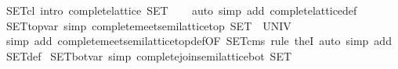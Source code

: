 \begin{isabellebody}
\endisatagproof
{\isafoldproof}%
%
\isadelimproof
\isanewline
%
\endisadelimproof
\isanewline
{}\isamarkupfalse%
\ SET{}cl\ {}intro{}{}\ {}complete{}lattice\ SET{}\isanewline
%
\isadelimproof
\ \ %
\endisadelimproof
%
\isatagproof
{}\isamarkupfalse%
\ {}auto\ simp\ add{}\ complete{}lattice{}def{}%
\endisatagproof
{\isafoldproof}%
%
\isadelimproof
\isanewline
%
\endisadelimproof
\isanewline
{}\isamarkupfalse%
\ SET{}top{}var\ {}simp{}{}\ {}complete{}meet{}semilattice{}top\ SET\ {}\ UNIV{}\isanewline
%
\isadelimproof
\ \ %
\endisadelimproof
%
\isatagproof
{}\isamarkupfalse%
\ {}simp\ add{}\ complete{}meet{}semilattice{}top{}def{}OF\ SET{}cms{}{}\ rule\ the{}I{}{}\ auto\ simp\ add{}\ SET{}def{}%
\endisatagproof
{\isafoldproof}%
%
\isadelimproof
\isanewline
%
\endisadelimproof
\isanewline
{}\isamarkupfalse%
\ SET{}bot{}var\ {}simp{}{}\ {}complete{}join{}semilattice{}bot\ SET\ {}\ {}{}{}\isanewline

\end{isabellebody}
